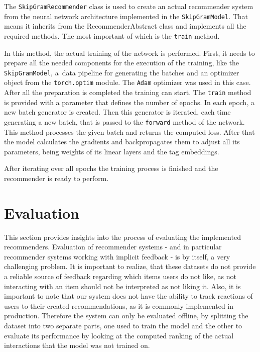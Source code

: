 The \texttt{SkipGramRecommender} class is used to create an actual recommender system from the neural network architecture implemented in the \texttt{SkipGramModel}. That means it inherits from the RecommenderAbstract class and implements all the required methods. The most important of which is the \texttt{train} method. 

In this method, the actual training of the network is performed. First, it needs to prepare all the needed components for the execution of the training, like the \texttt{SkipGramModel}, a~data pipeline for generating the batches and an optimizer object from the \texttt{torch.optim} module. The \texttt{Adam} optimizer was used in this case. After all the preparation is completed the training can start. The \texttt{train} method is provided with a parameter that defines the number of epochs. In each epoch, a new batch generator is created. Then this generator is iterated, each time generating a new batch, that is passed to the \texttt{forward} method of the network. This method processes the given batch and returns the computed loss. After that the model calculates the gradients and backpropagates them to adjust all its parameters, being weights of its linear layers and the tag embeddings. 

After iterating over all epochs the training process is finished and the recommender is ready to perform. 



\chapter{Evaluation} \label{evaluation}
This section provides insights into the process of evaluating the implemented recommenders. Evaluation of recommender systems - and in particular recommender systems working with implicit feedback - is by itself, a very challenging problem. It is important to realize, that these datasets do not provide a reliable source of feedback regarding which items users do not like, as not interacting with an item should not be interpreted as not liking it. Also, it is important to note that our system does not have the ability to track reactions of users to their created recommendations, as it is commonly implemented in production. Therefore the system can only be evaluated offline, by splitting the dataset into two separate parts, one used to train the model and the other to evaluate its performance by looking at the computed ranking of the actual interactions that the model was not trained on. 

